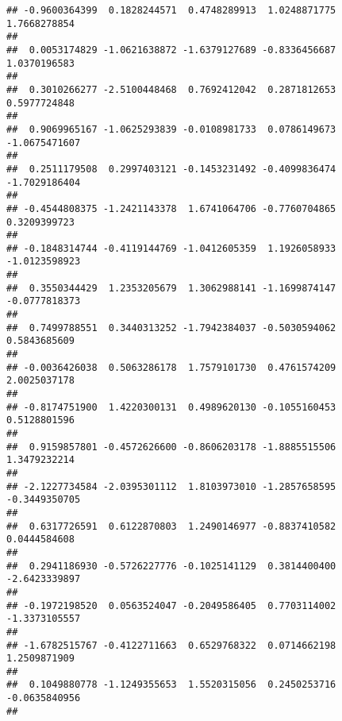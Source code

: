 \documentclass[]{article}
\begin{document}
\begin{verbatim}
## -0.9600364399  0.1828244571  0.4748289913  1.0248871775  1.7668278854 
##                                                                       
##  0.0053174829 -1.0621638872 -1.6379127689 -0.8336456687  1.0370196583 
##                                                                       
##  0.3010266277 -2.5100448468  0.7692412042  0.2871812653  0.5977724848 
##                                                                       
##  0.9069965167 -1.0625293839 -0.0108981733  0.0786149673 -1.0675471607 
##                                                                       
##  0.2511179508  0.2997403121 -0.1453231492 -0.4099836474 -1.7029186404 
##                                                                       
## -0.4544808375 -1.2421143378  1.6741064706 -0.7760704865  0.3209399723 
##                                                                       
## -0.1848314744 -0.4119144769 -1.0412605359  1.1926058933 -1.0123598923 
##                                                                       
##  0.3550344429  1.2353205679  1.3062988141 -1.1699874147 -0.0777818373 
##                                                                       
##  0.7499788551  0.3440313252 -1.7942384037 -0.5030594062  0.5843685609 
##                                                                       
## -0.0036426038  0.5063286178  1.7579101730  0.4761574209  2.0025037178 
##                                                                       
## -0.8174751900  1.4220300131  0.4989620130 -0.1055160453  0.5128801596 
##                                                                       
##  0.9159857801 -0.4572626600 -0.8606203178 -1.8885515506  1.3479232214 
##                                                                       
## -2.1227734584 -2.0395301112  1.8103973010 -1.2857658595 -0.3449350705 
##                                                                       
##  0.6317726591  0.6122870803  1.2490146977 -0.8837410582  0.0444584608 
##                                                                       
##  0.2941186930 -0.5726227776 -0.1025141129  0.3814400400 -2.6423339897 
##                                                                       
## -0.1972198520  0.0563524047 -0.2049586405  0.7703114002 -1.3373105557 
##                                                                       
## -1.6782515767 -0.4122711663  0.6529768322  0.0714662198  1.2509871909 
##                                                                       
##  0.1049880778 -1.1249355653  1.5520315056  0.2450253716 -0.0635840956 
##                                                                       

\end{verbatim}
\end{document}
